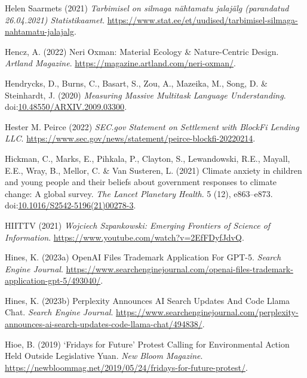 \documentclass[
  letterpaper,
  DIV=11,
  numbers=noendperiod]{scrartcl}
\newlength{\cslhangindent}
\newenvironment{CSLReferences}[2] %
 {\begin{list}{}{%
  \setlength{\itemindent}{0pt}
  \setlength{\leftmargin}{0pt}
  \setlength{\parsep}{0pt}
  \ifodd #1
   \setlength{\leftmargin}{\cslhangindent}
   \setlength{\itemindent}{-1\cslhangindent}
  \fi
  \setlength{\itemsep}{#2\baselineskip}}}
 {\end{list}}
\begin{document}
\begin{CSLReferences}{0}{1}
Helen Saarmets (2021) \emph{{Tarbimisel on silmaga n{ä}htamatu
jalaj{ä}lg (parandatud 26.04.2021) {\textbar} Statistikaamet}}.
\url{https://www.stat.ee/et/uudised/tarbimisel-silmaga-nahtamatu-jalajalg}.

Hencz, A. (2022) Neri {Oxman}: {Material Ecology} \& {Nature-Centric
Design}. \emph{Artland Magazine}.
\url{https://magazine.artland.com/neri-oxman/}.

Hendrycks, D., Burns, C., Basart, S., Zou, A., Mazeika, M., Song, D. \&
Steinhardt, J. (2020) \emph{Measuring {Massive Multitask Language
Understanding}}.
doi:\href{https://doi.org/10.48550/ARXIV.2009.03300}{10.48550/ARXIV.2009.03300}.

Hester M. Peirce (2022) \emph{{SEC}.gov {\textbar} {Statement} on
{Settlement} with {BlockFi Lending LLC}}.
\url{https://www.sec.gov/news/statement/peirce-blockfi-20220214}.

Hickman, C., Marks, E., Pihkala, P., Clayton, S., Lewandowski, R.E.,
Mayall, E.E., Wray, B., Mellor, C. \& Van Susteren, L. (2021) Climate
anxiety in children and young people and their beliefs about government
responses to climate change: A global survey. \emph{The Lancet Planetary
Health}. 5 (12), e863--e873.
doi:\href{https://doi.org/10.1016/S2542-5196(21)00278-3}{10.1016/S2542-5196(21)00278-3}.

HIITTV (2021) \emph{Wojciech {Szpankowski}: {Emerging Frontiers} of
{Science} of {Information}}.
\url{https://www.youtube.com/watch?v=2EfFDyfJdvQ}.

Hines, K. (2023a) {OpenAI Files Trademark Application For GPT-5}.
\emph{Search Engine Journal}.
\url{https://www.searchenginejournal.com/openai-files-trademark-application-gpt-5/493040/}.

Hines, K. (2023b) Perplexity {Announces AI Search Updates And Code Llama
Chat}. \emph{Search Engine Journal}.
\url{https://www.searchenginejournal.com/perplexity-announces-ai-search-updates-code-llama-chat/494838/}.

Hioe, B. (2019) {`{Fridays} for {Future}'} {Protest Calling} for
{Environmental Action Held Outside Legislative Yuan}. \emph{New Bloom
Magazine}.
\url{https://newbloommag.net/2019/05/24/fridays-for-future-protest/}.


\end{CSLReferences}
\end{document}
